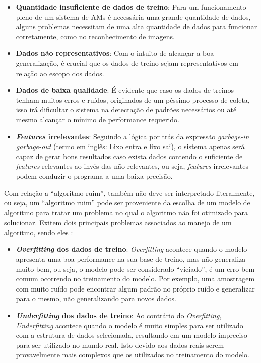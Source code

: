 \begin{itemize}
    \item \textbf{Quantidade insuficiente de dados de treino}: Para um funcionamento pleno de um sistema de AMs é necessária uma grande quantidade de dados, alguns problemas necessitam de uma alta quantidade de dados para funcionar corretamente, como no reconhecimento de imagens.
    \item \textbf{Dados não representativos}: Com o intuito de alcançar a boa generalização, é crucial que os dados de treino sejam representativos em relação ao escopo dos dados.
    \item \textbf{Dados de baixa qualidade}: É evidente que caso os dados de treinos tenham muitos erros e ruídos, originados de um péssimo processo de coleta, isso irá dificultar o sistema na detectação de padrões necessários ou até mesmo alcançar o mínimo de performance requerido.
    \item \textbf{\textit{Features}  irrelevantes}: Seguindo a lógica por trás da expressão \textit{garbage-in garbage-out} (termo em inglês: Lixo entra e lixo sai), o sistema apenas será capaz de gerar bons resultados caso exista dados contendo o suficiente de \textit{features} relevantes ao invés das não relevantes, ou seja, \textit{features} irrelevantes podem conduzir o programa a uma baixa precisão.
\end{itemize}

Com relação a “algoritmo ruim”, também não deve ser interpretado literalmente, ou seja, um “algoritmo ruim” pode ser proveniente da escolha de um modelo de algoritmo para tratar um problema no qual o algoritmo não foi otimizado para solucionar. Exitem dois principais problemas associados ao manejo de um algoritmo, sendo eles \cite{geron2017hands}:

\begin{itemize}
    \item \textbf{\textit{Overfitting} dos dados de treino}: \textit{Overfitting} acontece quando o modelo apresenta uma boa performance na sua base de treino, mas não generaliza muito bem, ou seja, o modelo pode ser considerado “viciado”, é um erro bem comum ocorrendo no treinamento do modelo. Por exemplo, uma amostragem com muito ruído pode encontrar algum padrão no próprio ruído e generalizar para o mesmo, não generalizando para novos dados.
    \item \textbf{\textit{Underfitting} dos dados de treino}: Ao contrário do \textit{Overfitting}, \textit{Underfitting} acontece quando o modelo é muito simples para ser utilizado com a estrutura de dados selecionada, resultando em um modelo impreciso para ser utilizado no mundo real. Isto devido aos dados reais serem provavelmente mais complexos que os utilizados no treinamento do modelo.
\end{itemize}

